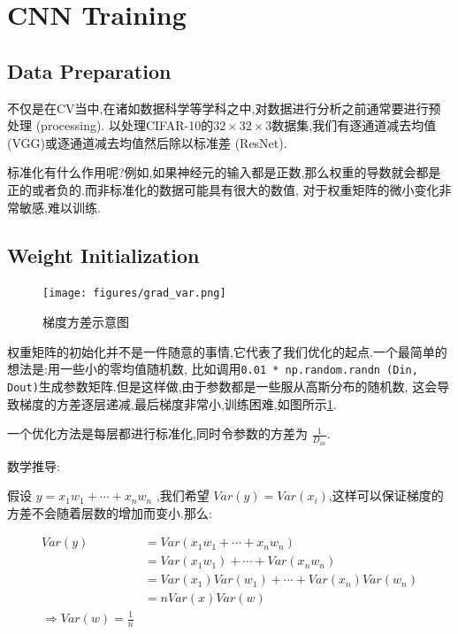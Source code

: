 \section{CNN Training}

\subsection{Data Preparation}

不仅是在CV当中,在诸如数据科学等学科之中,对数据进行分析之前通常要进行预处理 (processing).
以处理CIFAR-10的$32\times32\times3$数据集,我们有逐通道减去均值 (VGG)或逐通道减去均值然后除以标准差 (ResNet).

标准化有什么作用呢?例如,如果神经元的输入都是正数,那么权重的导数就会都是正的或者负的.而非标准化的数据可能具有很大的数值,
对于权重矩阵的微小变化非常敏感,难以训练.

\subsection{Weight Initialization}

\begin{figure}[htbp]
	\texttt{[image: figures/grad\_var.png]}
	\caption{梯度方差示意图}
	\label{grad_var}
\end{figure}

权重矩阵的初始化并不是一件随意的事情,它代表了我们优化的起点.一个最简单的想法是:用一些小的零均值随机数,
比如调用\texttt{0.01 * np.random.randn (Din, Dout)}生成参数矩阵.但是这样做,由于参数都是一些服从高斯分布的随机数,
这会导致梯度的方差逐层递减,最后梯度非常小,训练困难,如图所示\ref{grad_var}.

一个优化方法是每层都进行标准化,同时令参数的方差为 $\frac{1}{D_{in}}$.

数学推导:

假设 $y=x_1w_1+\cdots+x_nw_n$ ,我们希望 $Var(y)=Var(x_i)$,这样可以保证梯度的方差不会随着层数的增加而变小.那么:

\begin{equation}
	\begin{aligned}
		Var(y) &= Var(x_1w_1+\cdots+x_nw_n)
		\\
		&= Var(x_1w_1)+\cdots+Var (x_nw_n)
		\\
		&= Var(x_1)Var(w_1)+\cdots+Var(x_n)Var(w_n)
		\\
		&= n Var(x)Var(w)
		\\
		\Rightarrow Var(w)=\frac{1}{n}
	\end{aligned}
\end{equation}

